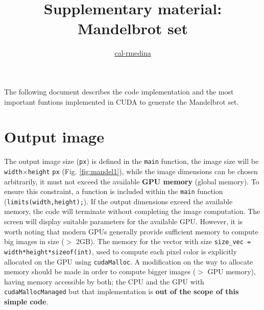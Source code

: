 \documentclass{article}
\title{Supplementary material: Mandelbrot set}
\author{\href{https://github.com/cal-rmedina}{cal-rmedina}}
\date{}
\begin{document}
\maketitle

The following document describes the code implementation and the most important
funtions implemented in CUDA to generate the Mandelbrot set.

\section*{Output image}

 The output image size (\texttt{px}) is defined in the \verb|main| function,
the image size will be \verb|width|$\times$\verb|height| \texttt{px} (Fig.
\ref{fig:mandel1}), while the image dimensions can be chosen arbitrarily, it
must not exceed the available \textbf{GPU memory} (global memory). To ensure
this constraint, a function is included within the \verb|main| function
(\verb|limits(width,height);|). If the output dimensions exceed the available
memory, the code will terminate without completing the image computation. The
screen will display suitable parameters for the available GPU. However, it is
worth noting that modern GPUs generally provide sufficient memory to compute
big images in size ($>$ 2GB). The memory for the vector with size
\verb|size_vec = width*height*sizeof(int)|, used to compute each pixel color is
explicitly allocated on the GPU using \texttt{cudaMalloc}. 
A modification on the way to allocate memory should be made in order to compute
bigger images ($>$ GPU memory), having memory accessible by both; the CPU and
the GPU with \texttt{cudaMallocManaged} but that implementation is \textbf{out of the
scope of this simple code}.
\end{document}
